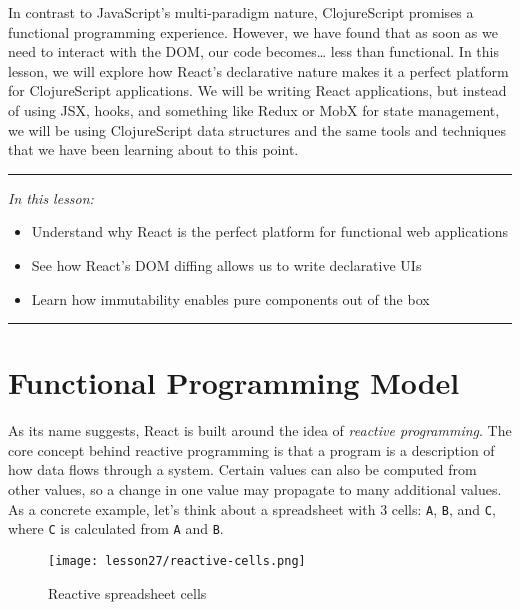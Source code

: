 \documentclass[10pt,twoside,openright]{memoir}
\begin{document}
In contrast to JavaScript's multi-paradigm nature, ClojureScript
promises a functional programming experience. However, we have found
that as soon as we need to interact with the DOM, our code
becomes\ldots{} less than functional. In this lesson, we will explore
how React's declarative nature makes it a perfect platform for
ClojureScript applications. We will be writing React applications, but
instead of using JSX, hooks, and something like Redux or MobX for state
management, we will be using ClojureScript data structures and the same
tools and techniques that we have been learning about to this point.

\begin{center}\rule{0.5\linewidth}{0.5pt}\end{center}

\emph{In this lesson:}

\begin{itemize}
\tightlist
\item
  Understand why React is the perfect platform for functional web
  applications
\item
  See how React's DOM diffing allows us to write declarative UIs
\item
  Learn how immutability enables pure components out of the box
\end{itemize}

\begin{center}\rule{0.5\linewidth}{0.5pt}\end{center}


\section{Functional Programming Model}

As its name suggests, React is built around the idea of \emph{reactive
programming}. The core concept behind reactive programming is that a
program is a description of how data flows through a system. Certain
values can also be computed from other values, so a change in one value
may propagate to many additional values. As a concrete example, let's
think about a spreadsheet with 3 cells: \texttt{A}, \texttt{B}, and
\texttt{C}, where \texttt{C} is calculated from \texttt{A} and
\texttt{B}.


\begin{figure}[H]
\caption{Reactive spreadsheet cells}
\centering
\texttt{[image: lesson27/reactive-cells.png]}
\end{figure}
\end{document}
